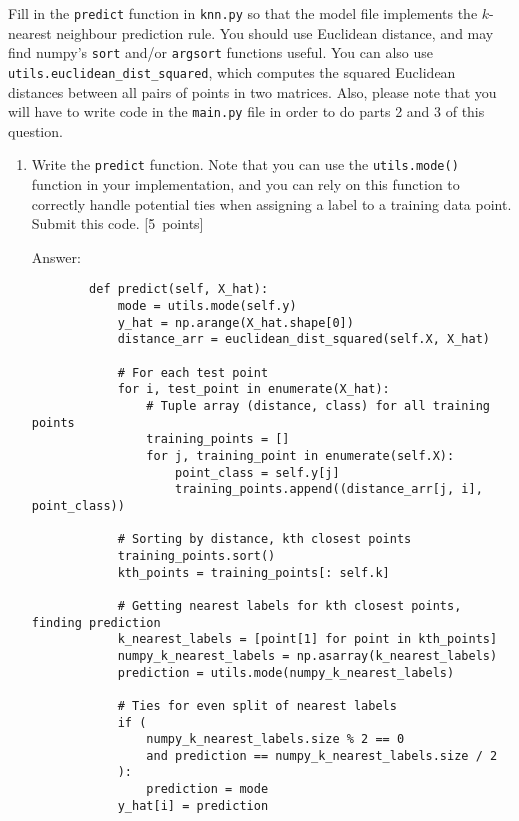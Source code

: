 \documentclass{article}
\newcommand{\blu}[1]{{\textcolor{blu}{#1}}}
\newenvironment{answer}{\par\begingroup\color{gre}Answer: }{\endgroup}
\let\ask\blu
\newcommand\pts[1]{\textcolor{pointscolour}{[#1~points]}}
\begin{document}
    Fill in the \texttt{predict} function in \texttt{knn.py} so that the model file implements the $k$-nearest neighbour prediction rule.
    You should use Euclidean distance, and may find numpy's \texttt{sort} and/or \texttt{argsort} functions useful.
    You can also use \texttt{utils.euclidean\string_dist\string_squared}, which computes the squared Euclidean distances between all pairs of points in two matrices. Also, please note that you will have to write code in the \texttt{main.py} file in order to do parts 2 and 3 of this question.
    \begin{enumerate}
        \item Write the \texttt{predict} function. Note that you can use the \texttt{utils.mode()} function in your implementation, and you can rely on this function to correctly handle potential ties when assigning a label to a training data point. \ask{Submit this code.} \pts{5}
        \begin{answer}
        \begin{verbatim}
        def predict(self, X_hat):
            mode = utils.mode(self.y)
            y_hat = np.arange(X_hat.shape[0])
            distance_arr = euclidean_dist_squared(self.X, X_hat)

            # For each test point
            for i, test_point in enumerate(X_hat):
                # Tuple array (distance, class) for all training points
                training_points = []
                for j, training_point in enumerate(self.X):
                    point_class = self.y[j]
                    training_points.append((distance_arr[j, i], point_class))

            # Sorting by distance, kth closest points
            training_points.sort()
            kth_points = training_points[: self.k]

            # Getting nearest labels for kth closest points, finding prediction
            k_nearest_labels = [point[1] for point in kth_points]
            numpy_k_nearest_labels = np.asarray(k_nearest_labels)
            prediction = utils.mode(numpy_k_nearest_labels)

            # Ties for even split of nearest labels
            if (
                numpy_k_nearest_labels.size % 2 == 0
                and prediction == numpy_k_nearest_labels.size / 2
            ):
                prediction = mode
            y_hat[i] = prediction


\end{verbatim}
\end{answer}
\end{enumerate}
\end{document}
